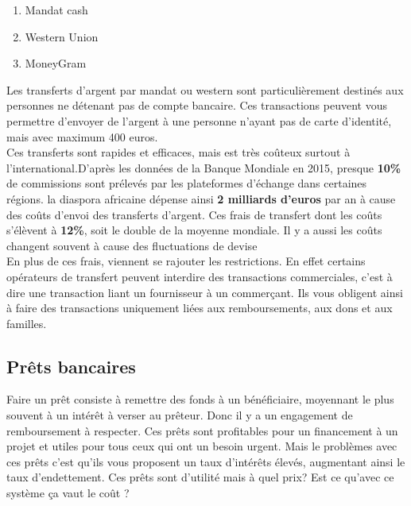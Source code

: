 \documentclass[12pt]{report}
\begin{document}
\begin{enumerate}
    \begin{enumerate}
        \item Mandat cash
        \item Western Union
        \item MoneyGram 
    \end{enumerate}
    
Les transferts d'argent par mandat ou western sont particulièrement destinés aux personnes ne détenant pas de compte bancaire. Ces transactions peuvent vous permettre d'envoyer de l'argent à une personne n'ayant pas de carte d'identité, mais avec maximum 400 euros.\\

\hspace{1cm} Ces transferts sont rapides et efficaces, mais est très coûteux surtout à l'international.D'après les données de la Banque Mondiale en 2015,  presque \textbf{10\%} de commissions sont prélevés par les plateformes d’échange dans certaines régions. la diaspora africaine dépense ainsi \textbf{2 milliards d'euros} par an à cause des coûts d'envoi des transferts d'argent.  Ces frais de transfert dont les coûts s'élèvent à \textbf{12\%}, soit le double de la moyenne mondiale. Il y a aussi les coûts changent souvent à cause des fluctuations de devise\\

\hspace{1cm} En plus de ces frais, viennent se rajouter les restrictions. En effet certains opérateurs de transfert peuvent interdire des transactions commerciales, c'est à dire une transaction liant un fournisseur à un commerçant. Ils vous obligent ainsi à faire des transactions uniquement liées aux remboursements, aux dons et aux familles.\\
    
\end{enumerate}

    \subsection{Prêts bancaires}
    
\hspace{1cm} Faire un prêt consiste à remettre des fonds à un bénéficiaire, moyennant le plus souvent à un intérêt à verser au prêteur. Donc il y a un engagement de remboursement à respecter. Ces prêts sont profitables pour un financement à un projet et utiles pour tous ceux qui ont un besoin urgent. Mais 
le problèmes avec ces prêts c'est qu'ils vous proposent un taux d'intérêts élevés, augmentant ainsi le taux d'endettement. Ces prêts sont d'utilité mais à quel prix? Est ce qu'avec ce système ça vaut le coût ?
\end{document}
